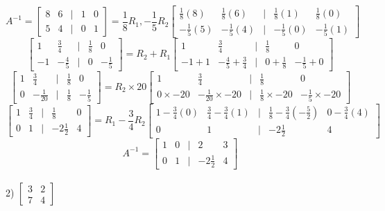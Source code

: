 \documentclass[a4paper]{article}
\begin{document}
\[A^{-1} = 
\begin{bmatrix}
8&6&|&1&0\\
5&4&|&0&1
\end{bmatrix} = \frac{1}{8}R_1 , -\frac{1}{5}R_2
\begin{bmatrix}
\frac{1}{8}(8)&\frac{1}{8}(6)&|&\frac{1}{8}(1)&\frac{1}{8}(0)\\
-\frac{1}{5}(5)&-\frac{1}{5}(4)&|&-\frac{1}{5}(0)&-\frac{1}{5}(1)
\end{bmatrix}\]
\[
\begin{bmatrix}
1&\frac{3}{4}&|&\frac{1}{8}&0\\
-1&-\frac{4}{5}&|&0&-\frac{1}{5}
\end{bmatrix} = R_2+R_1
\begin{bmatrix}
1&\frac{3}{4}&|&\frac{1}{8}&0\\
-1+1&-\frac{4}{5}+\frac{3}{4}&|&0+\frac{1}{8}&-\frac{1}{5}+0
\end{bmatrix}
\]
\[
\begin{bmatrix}
1&\frac{3}{4}&|&\frac{1}{8}&0\\
0&-\frac{1}{20}&|&\frac{1}{8}&-\frac{1}{5}
\end{bmatrix} =R_2\times20
\begin{bmatrix}
1&\frac{3}{4}&|&\frac{1}{8}&0\\
0\times-20&-\frac{1}{20}\times-20&|&\frac{1}{8}\times-20&-\frac{1}{5}\times-20
\end{bmatrix}
\]
\[
\begin{bmatrix}
1&\frac{3}{4}&|&\frac{1}{8}&0\\
0&1&|&-2\frac{1}{2}&4
\end{bmatrix} = R_1-\frac{3}{4}R_2
\begin{bmatrix}
1-\frac{3}{4}(0)&\frac{3}{4}-\frac{3}{4}(1)&|&\frac{1}{8}-\frac{3}{4}(-\frac{5}{2})&0-\frac{3}{4}(4)\\
0&1&|&-2\frac{1}{2}&4
\end{bmatrix}
\]
\[A^{-1} =
\begin{bmatrix}
1&0&|&2&3\\
0&1&|&-2\frac{1}{2}&4
\end{bmatrix}
\]\\

2) $\begin{bmatrix}
3&2\\
7&4
\end{bmatrix}$
\end{document}
